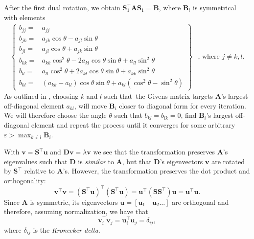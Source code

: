 \documentclass[]{article}
\begin{document}
After the first dual rotation, we obtain $\mathbf{S}_1^\intercal \mathbf{A} \mathbf{S}_1 = \mathbf{B}$, where $\mathbf{B}_i$ is symmetrical with elements
\begin{equation}
\label{b_elements}
\begin{array}{cc}
\left\{
\begin{aligned}
b_{jj} =& a_{jj} \\
b_{jk} =& a_{jk}\cos\theta - a_{jl}\sin\theta \\
b_{jl} =& a_{jl}\cos\theta + a_{jk}\sin\theta \\
b_{kk} =& a_{kk}\cos^2\theta - 2a_{kl}\cos\theta \sin\theta +a_{ll}\sin^2\theta\nonumber\\
b_{ll} =& a_{ll}\cos^2\theta +2a_{kl}\cos\theta \sin\theta +a_{kk}\sin^2\theta\nonumber\\
b_{kl} =& (a_{kk}-a_{ll})\cos\theta \sin\theta +a_{kl}(\cos^2\theta-\sin^2\theta)\nonumber 
\end{aligned}
\right\} &
\text{, where } j \ne k,l.
\end{array}
\end{equation}
As outlined in \cite{fys4150-notes}, choosing $k$ and $l$ such that the Givens matrix targets $\mathbf{A}$'s largest off-diagonal element $a_{kl}$, will move $\mathbf{B}_i$ closer to diagonal form for every iteration. We will therefore choose the angle $\theta$ such that $b_{kl} = b_{lk} = 0$, find $\mathbf{B}_i$'s largest off-diagonal element and repeat the process until it converges for some arbitrary $\varepsilon > \max_{k \neq l} \mathbf{B}_i$.

With $\mathbf{v} = \mathbf{S}^\intercal \mathbf{u}$ and $\mathbf{D} \mathbf{v} = \lambda \mathbf{v}$ we see that the transformation preserves $\mathbf{A}$'s eigenvalues such that $\mathbf{D}$ is \textit{similar} to $\mathbf{A}$, but that $\mathbf{D}$'s eigenvectors $\mathbf{v}$ are rotated by $\mathbf{S}^\intercal$ relative to $\mathbf{A}$'s. However, the transformation preserves the dot product and orthogonality:
\[
\mathbf{v}^\intercal \mathbf{v} = (\mathbf{S}^\intercal \mathbf{u})^\intercal (\mathbf{S}^\intercal \mathbf{u}) = \mathbf{u}^\intercal (\mathbf{S} \mathbf{S}^\intercal) \mathbf{u} = \mathbf{u}^\intercal \mathbf{u}.
\]
Since $\mathbf{A}$ is symmetric, its eigenvectors $\mathbf{u} = [\mathbf{u}_1 \quad \mathbf{u}_2\ldots ]$ are orthogonal and therefore, assuming normalization, we have that
\[
\mathbf{v}^\intercal_i \mathbf{v}_j = \mathbf{u}^\intercal_i \mathbf{u}_j = \delta_{ij},
\]
where $\delta_{ij}$ is the \textit{Kronecker delta}.
\end{document}
